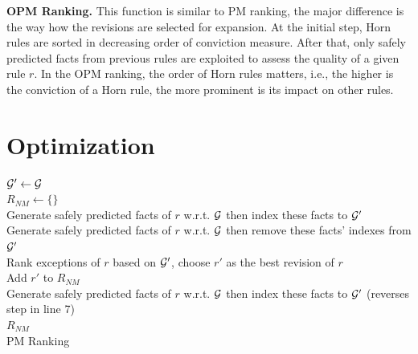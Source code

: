 \textbf{OPM Ranking.} This function is similar to PM ranking, the major difference is the way how the revisions are selected for expansion. At the initial step, Horn rules are sorted in decreasing order of conviction measure. After that, only safely predicted facts from previous rules are exploited to assess the quality of a given rule $r$. In the OPM ranking, the order of Horn rules matters, i.e., the higher is the conviction of a Horn rule, the more prominent is its impact on other rules.


\section{Optimization}

\IncMargin{1.5em}
\begin{algorithm}[h]
\DontPrintSemicolon
\SetAlgoLined
{}
\BlankLine
$\mathcal{G}' \leftarrow \mathcal{G}$\\
$R_{NM} \leftarrow \{\}$\\
\BlankLine
{} {
	Generate safely predicted facts of $r$ w.r.t. $\mathcal{G}$ then index these facts to $\mathcal{G}'$\\
}
\BlankLine
{} {
	Generate safely predicted facts of $r$ w.r.t. $\mathcal{G}$ then remove these facts' indexes from $\mathcal{G}'$\\
	Rank exceptions of $r$ based on $\mathcal{G}'$, choose $r'$ as the best revision of $r$\\
	Add $r'$ to $R_{NM}$\\
	Generate safely predicted facts of $r$ w.r.t. $\mathcal{G}$ then index these facts to $\mathcal{G}'$ (reverses step in line 7)\\
}
\Return $R_{NM}$\\
\caption{PM Ranking}
\label{pm_ranking_algo}
\end{algorithm}
\DecMargin{1.5em}


